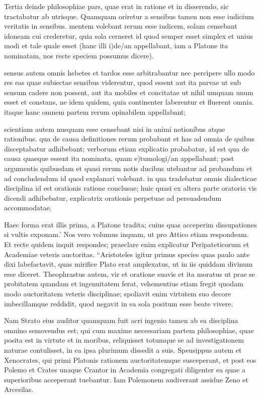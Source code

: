  Tertia deinde philosophiae pars, quae erat in ratione et in disserendo, sic tractabatur ab utrisque. Quamquam oriretur a sensibus tamen non esse iudicium veritatis in sensibus. mentem volebant rerum esse iudicem, solam censebant idoneam cui crederetur, quia sola cerneret id quod semper esset simplex et unius modi et tale quale esset (hanc illi i)de/an appellabant, iam a Platone ita nominatam, nos recte speciem possumus dicere).

 sensus autem omnis hebetes et tardos esse arbitrabantur nec percipere ullo modo res eas quae subiectae sensibus viderentur, quod essent aut ita parvae ut sub sensum cadere non possent, aut ita mobiles et concitatae ut nihil umquam unum esset et constans, ne idem quidem, quia continenter laberentur et fluerent omnia. itaque hanc omnem partem rerum opinabilem appellabant;

 scientiam autem nusquam esse censebant nisi in animi notionibus atque rationibus. qua de causa definitiones rerum probabant et has ad omnia de quibus disceptabatur adhibebant; verborum etiam explicatio probabatur, id est qua de causa quaeque essent ita nominata, quam e)tumologi/an appellabant; post argumentis quibusdam et quasi rerum notis ducibus utebantur ad probandum et ad concludendum id quod explanari volebant. in qua tradebatur omnis dialecticae disciplina id est orationis ratione conclusae; huic quasi ex altera parte oratoria vis dicendi adhibebatur, explicatrix orationis perpetuae ad persuadendum accommodatae.

 Haec forma erat illis prima, a Platone tradita; cuius quas acceperim dissupationes si vultis exponam.' Nos vero volumus inquam, ut pro Attico etiam respondeam. Et recte quidem inquit respondes; praeclare enim explicatur Peripateticorum et Academiae veteris auctoritas. ``Aristoteles igitur primus species quas paulo ante dixi labefactavit, quas mirifice Plato erat amplexatus, ut in iis quiddam divinum esse diceret. Theophrastus autem, vir et oratione suavis et ita moratus ut prae se probitatem quandam et ingenuitatem ferat, vehementius etiam fregit quodam modo auctoritatem veteris disciplinae; spoliavit enim virtutem suo decore imbecillamque reddidit, quod negavit in ea sola positum esse beate vivere.

 Nam Strato eius auditor quamquam fuit acri ingenio tamen ab ea disciplina omnino semovendus est; qui cum maxime necessariam partem philosophiae, quae posita est in virtute et in moribus, reliquisset totumque se ad investigationem naturae contulisset, in ea ipsa plurimum dissedit a suis. Speusippus autem et Xenocrates, qui primi Platonis rationem auctoritatemque susceperant, et post eos Polemo et Crates unaque Crantor in Academia congregati diligenter ea quae a superioribus acceperant tuebantur. Iam Polemonem audiverant assidue Zeno et Arcesilas.

